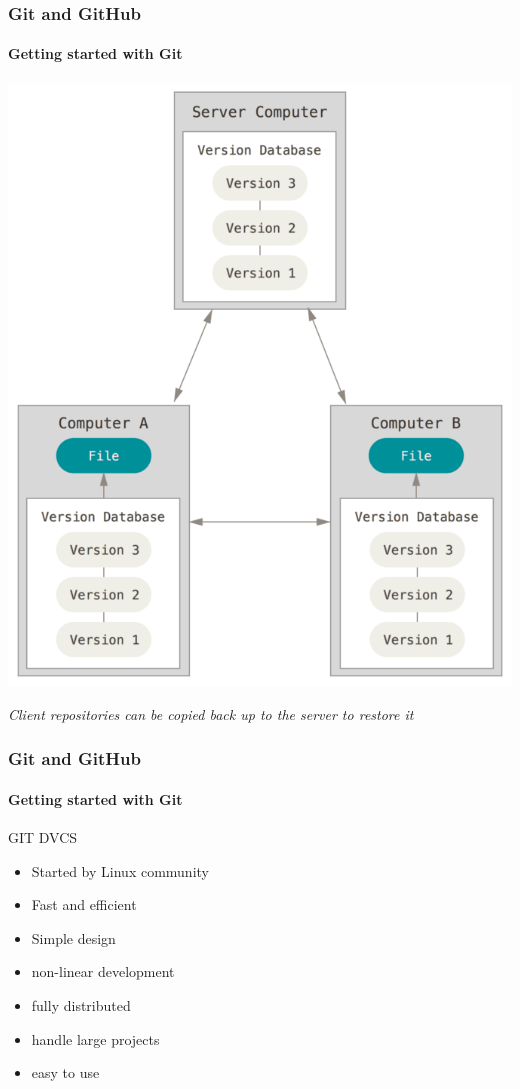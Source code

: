 \begin{frame}
    \frametitle{Git and GitHub}
    \framesubtitle{Getting started with Git}
    \addtocounter{nframe}{1}
    
        \begin{center}

            \includegraphics[width=.5\textwidth]{imgs/distributed.png}
    
        \end{center}
    
    \textit{Client repositories can be copied back up to the server to restore it}

\end{frame}

\begin{frame}
    \frametitle{Git and GitHub}
    \framesubtitle{Getting started with Git}
    \addtocounter{nframe}{1}
    
    \begin{block}{GIT DVCS}
       \begin{itemize}
           \item Started by Linux community
           \item Fast and efficient 
           \item Simple design
           \item non-linear development
           \item fully distributed
           \item handle large projects
           \item easy to use
       \end{itemize}
    
    \end{block}

\end{frame}

